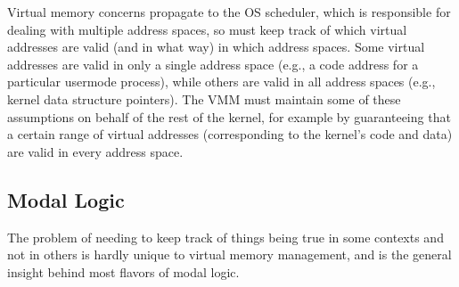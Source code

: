 
Virtual memory concerns propagate to the OS scheduler, which is responsible for dealing with multiple 
address spaces, so must keep track of which virtual addresses are valid (and in what way) in which address spaces. 
Some virtual addresses are valid in only a single address space (e.g., a code address for a particular usermode 
process), while others are valid in all address spaces (e.g., kernel data structure pointers). 
The VMM must maintain some of these assumptions on behalf of the rest of the kernel, for example by guaranteeing that 
a certain range of virtual addresses (corresponding to the kernel's code and data) are valid in every address space.

\subsection{Modal Logic}
\label{sec:backgroundonmodallogic}
The problem of needing to keep track of things being true in some contexts and not in others is hardly unique to virtual 
memory management, and is the general insight behind most flavors of modal logic.

